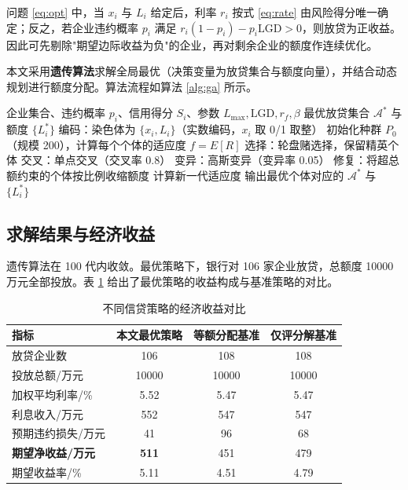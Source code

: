 \documentclass[12pt]{ctexart}
\begin{document}
问题 \eqref{eq:opt} 中，当 $x_i$ 与 $L_i$ 给定后，利率 $r_i$ 按式 \eqref{eq:rate} 由风险得分唯一确定；反之，若企业违约概率 $p_i$ 满足 $r_i(1-p_i)-p_i\mathrm{LGD}>0$，则放贷为正收益。因此可先剔除"期望边际收益为负"的企业，再对剩余企业的额度作连续优化。

本文采用\textbf{遗传算法}求解全局最优（决策变量为放贷集合与额度向量），并结合动态规划进行额度分配。算法流程如算法 \ref{alg:ga} 所示。

\begin{algorithm}[H]
\caption{基于遗传算法的最优信贷决策求解}
\label{alg:ga}
\begin{algorithmic}
\REQUIRE 企业集合、违约概率 $p_i$、信用得分 $S_i$、参数 $L_{\max},\mathrm{LGD},r_f,\beta$
\ENSURE 最优放贷集合 $\mathcal{A}^{*}$ 与额度 $\{L_i^{*}\}$
\STATE 编码：染色体为 $\{x_i, L_i\}$（实数编码，$x_i$ 取 0/1 取整）
\STATE 初始化种群 $P_0$（规模 200），计算每个个体的适应度 $f=E[R]$
    \STATE 选择：轮盘赌选择，保留精英个体
    \STATE 交叉：单点交叉（交叉率 0.8）
    \STATE 变异：高斯变异（变异率 0.05）
    \STATE 修复：将超总额约束的个体按比例收缩额度
    \STATE 计算新一代适应度
\ENDFOR
\STATE 输出最优个体对应的 $\mathcal{A}^{*}$ 与 $\{L_i^{*}\}$
\end{algorithmic}
\end{algorithm}

\subsection{求解结果与经济收益}

遗传算法在 100 代内收敛。最优策略下，银行对 106 家企业放贷，总额度 10000 万元全部投放。表 \ref{tab:q3} 给出了最优策略的收益构成与基准策略的对比。

\begin{table}[H]
\centering
\caption{不同信贷策略的经济收益对比}
\label{tab:q3}
\small
\begin{tabular}{lccc}
\toprule
\textbf{指标} & \textbf{本文最优策略} & \textbf{等额分配基准} & \textbf{仅评分解基准} \\
\midrule
放贷企业数 & 106 & 108 & 108 \\
投放总额/万元 & 10000 & 10000 & 10000 \\
加权平均利率/\% & 5.52 & 5.47 & 5.47 \\
利息收入/万元 & 552 & 547 & 547 \\
预期违约损失/万元 & 41 & 96 & 68 \\
\textbf{期望净收益/万元} & \textbf{511} & 451 & 479 \\
期望收益率/\% & 5.11 & 4.51 & 4.79 \\
\bottomrule
\end{tabular}
\end{table}
\end{document}
